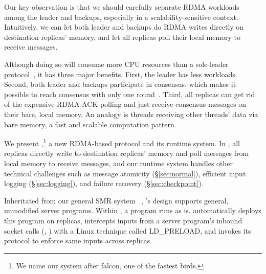 Our key observation is that we should carefully separate RDMA workloads among
the leader and backups, especially in a scalability-sensitive context. 
Intuitively, we can let both leader and backups do RDMA writes directly on 
destination replicas' memory, and let all replicas poll their local memory to 
receive messages.

Although doing so will consume more CPU resources than a sole-leader 
protocol~\cite{dare:hpdc15}, it has three major benefits. First, the leader 
has less workloads. Second, both leader and backups participate in consensus, 
which makes it possible to reach consensus with only one 
round~\cite{paxos:practical}. Third, all replicas can get rid of 
the expensive RDMA ACK polling and just receive consensus messages on their 
bare, local memory. An analogy is threads receiving other threads' data via 
bare memory, a fast and scalable computation pattern.

We present \xxx,\footnote{We name our system after
falcon, one of the fastest birds.} a new RDMA-based \paxos protocol and its
runtime system. In \xxx, all replicas directly write to destination
replicas' memory and poll messages from local memory to receive messages, and 
our runtime system handles other technical challenges such as message 
atomicity (\S\ref{sec:normal}), efficient input logging (\S\ref{sec:logging}), 
and failure recovery (\S\ref{sec:checkpoint}).

Inheritated from our general SMR system \crane~\cite{crane:sosp15}, \xxx's 
design supports general, unmodified server programs. Within \xxx, a program 
runs as is. \xxx automatically deploys this program on replicas, intercepts 
inputs from a server program's inbound socket calls (\eg, \recv) with a Linux 
technique called LD\_PRELOAD, and invokes its \paxos protocol to enforce same 
inputs across replicas.


